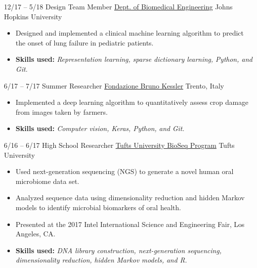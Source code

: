 \cventry
{12/17 -- 5/18}
{Design Team Member}
{\href{https://cbid.bme.jhu.edu/academics/undergraduate-studies/}{Dept. of Biomedical Engineering}}
{Johns Hopkins University}
{}
{
\begin{itemize}
    \item Designed and implemented a clinical machine learning algorithm to predict the onset of lung failure in pediatric patients.
    \item \textbf{Skills used:} \textit{Representation learning, sparse dictionary learning, Python, and Git.}
\end{itemize}{}
}

\cventry
{6/17 -- 7/17}
{Summer Researcher}
{\href{https://webvalley.fbk.eu}{Fondazione Bruno Kessler}}
{Trento, Italy}
{}
{
\begin{itemize}
    \item Implemented a deep learning algorithm to quantitatively assess crop damage from images taken by farmers.
    \item \textbf{Skills used:} \textit{Computer vision, Keras, Python, and Git.}
\end{itemize}{}
}

\cventry
{6/16 -- 6/17}
{High School Researcher}
{\href{http://ase.tufts.edu/chemistry/walt/sepa/index.html}{Tufts University BioSeq Program}}
{Tufts University}
{}
{
\begin{itemize}
    \item Used next-generation sequencing (NGS) to generate a novel human oral microbiome data set.
    \item Analyzed sequence data using dimensionality reduction and hidden Markov models to identify microbial biomarkers of oral health.
    \item Presented at the 2017 Intel International Science and Engineering Fair, Los Angeles, CA.
    \item \textbf{Skills used:} \textit{DNA library construction, next-generation sequencing, dimensionality reduction, hidden Markov models, and R.}
\end{itemize}{}
}